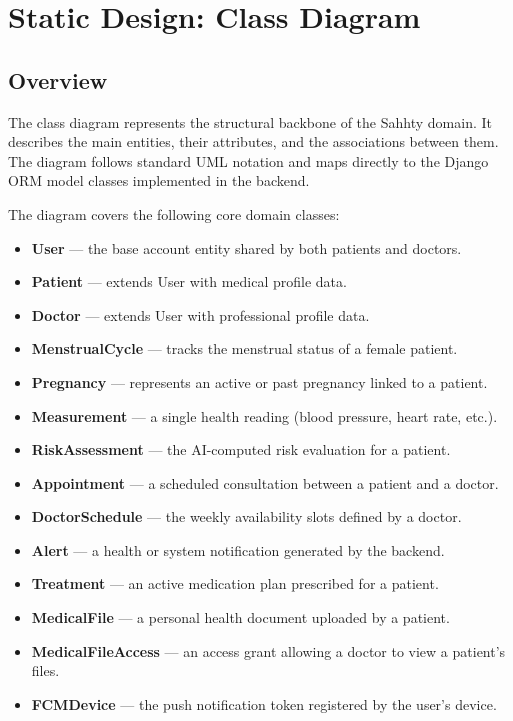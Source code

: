 \section{Static Design: Class Diagram}

\subsection{Overview}

The class diagram represents the structural backbone of the Sahhty domain. It describes the main entities, their attributes, and the associations between them. The diagram follows standard UML notation and maps directly to the Django ORM model classes implemented in the backend.

The diagram covers the following core domain classes:

\begin{itemize}
    \item \textbf{User} — the base account entity shared by both patients and doctors.
    \item \textbf{Patient} — extends User with medical profile data.
    \item \textbf{Doctor} — extends User with professional profile data.
    \item \textbf{MenstrualCycle} — tracks the menstrual status of a female patient.
    \item \textbf{Pregnancy} — represents an active or past pregnancy linked to a patient.
    \item \textbf{Measurement} — a single health reading (blood pressure, heart rate, etc.).
    \item \textbf{RiskAssessment} — the AI-computed risk evaluation for a patient.
    \item \textbf{Appointment} — a scheduled consultation between a patient and a doctor.
    \item \textbf{DoctorSchedule} — the weekly availability slots defined by a doctor.
    \item \textbf{Alert} — a health or system notification generated by the backend.
    \item \textbf{Treatment} — an active medication plan prescribed for a patient.
    \item \textbf{MedicalFile} — a personal health document uploaded by a patient.
    \item \textbf{MedicalFileAccess} — an access grant allowing a doctor to view a patient's files.
    \item \textbf{FCMDevice} — the push notification token registered by the user's device.
\end{itemize}

